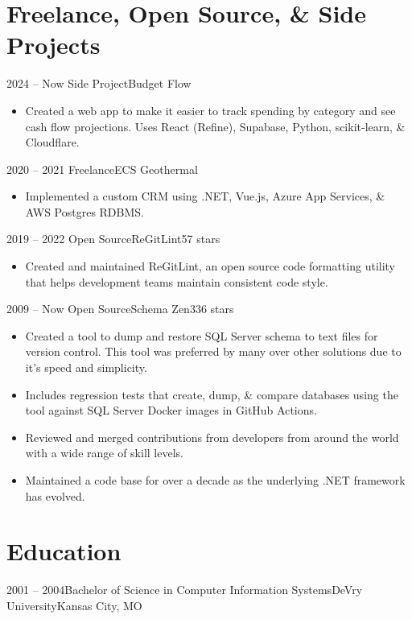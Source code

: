 \documentclass[11pt,letterpaper,final]{moderncv}
\begin{document}
\section{Freelance, Open Source, \& Side Projects} 
	\cventry
{2024 -- Now} {Side Project}{Budget Flow}{}{}{
		\begin{itemize}
			\item 
				Created a web app to make it easier to track spending by
				category and see cash flow projections. Uses React (Refine),
				Supabase, Python, scikit-learn, \& Cloudflare.
		\end{itemize}
}
\linebreak

	\cventry
{2020 -- 2021} {Freelance}{ECS Geothermal}{}{}{
		\begin{itemize}
			\item 
				Implemented a custom CRM using .NET, Vue.js, Azure App Services,
				\& AWS Postgres RDBMS.
		\end{itemize}
}
\linebreak

	\cventry
{2019 -- 2022} {Open Source}{ReGitLint}{}{57 stars}{
		\begin{itemize}
			\item 
				Created and maintained ReGitLint, an open source code formatting
				utility that helps development teams maintain consistent code
				style.
		\end{itemize}
}
\linebreak

	\cventry
{2009 -- Now } {Open Source}{Schema Zen}{}{336 stars}{
		\begin{itemize}
			\item 
				Created a tool to dump and restore SQL Server schema to text
				files for version control. This tool was preferred by many over
				other solutions due to it's speed and simplicity.
			\item 
				Includes regression tests that create, dump, \& compare
				databases using the tool against SQL Server Docker images in
				GitHub Actions.
			\item 
				Reviewed and merged contributions from developers from around the world
				with a wide range of skill levels.
			\item 
				Maintained a code base for over a decade as the underlying .NET
				framework has evolved.
		\end{itemize}
}
\linebreak


\section{Education} 
	\cventry
{2001 -- 2004}{Bachelor of Science in Computer Information Systems}{DeVry University}{Kansas City, MO}{}{}
\end{document}
